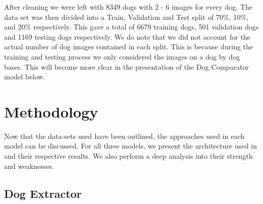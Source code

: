 \documentclass{article}
\begin{document}
\noindent After cleaning we were left with 8349 dogs with 2 - 6 images for every dog.  The data set was then divided into a Train, Validation and Test split of 70\%, 10\%, and 20\% respectively.  This gave a total of 6679 training dogs, 501 validation dogs and 1169 testing dogs respectively.  We do note that we did not account for the actual number of dog images contained in each split.  This is because during the training and testing process we only considered the images on a dog by dog bases.  This will become more clear in the presentation of the Dog Comparator model below.

\section{Methodology}
Now that the data-sets used have been outlined, the approaches used in each model can be discussed.  For all three models, we present the architecture used in and their respective results.  We also perform a deep analysis into their strength and weaknesses.  

\subsection{Dog Extractor}
\end{document}
